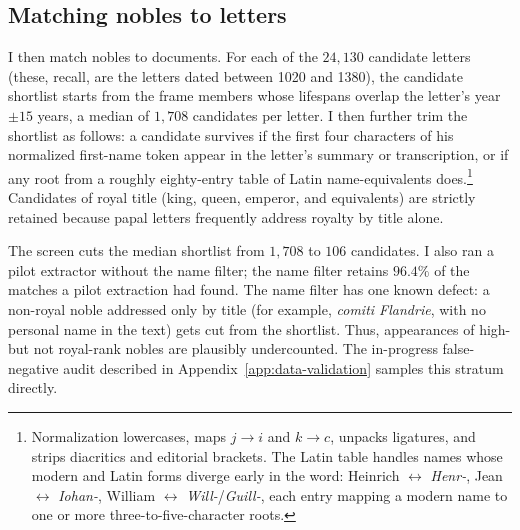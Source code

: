 \documentclass[12pt]{article}
\theoremstyle{definition}
\theoremstyle{remark}
\begin{document}
\subsection{Matching nobles to letters}
\label{app:data-matching}

I then match nobles to documents. For each of the $24{,}130$ candidate letters (these, recall, are the letters dated between 1020 and 1380), the candidate shortlist starts from the frame members whose lifespans overlap the letter's year $\pm 15$ years, a median of $1{,}708$ candidates per letter. I then further trim the shortlist as follows: a candidate survives if the first four characters of his normalized first-name token appear in the letter's summary or transcription, or if any root from a roughly eighty-entry table of Latin name-equivalents does.\footnote{Normalization lowercases, maps $j\to i$ and $k \to c$, unpacks ligatures, and strips diacritics and editorial brackets. The Latin table handles names whose modern and Latin forms diverge early in the word: Heinrich $\leftrightarrow$ \emph{Henr-}, Jean $\leftrightarrow$ \emph{Iohan-}, William $\leftrightarrow$ \emph{Will-}/\emph{Guill-}, each entry mapping a modern name to one or more three-to-five-character roots.} Candidates of royal title (king, queen, emperor, and equivalents) are strictly retained because papal letters frequently address royalty by title alone.

The screen cuts the median shortlist from $1{,}708$ to $106$ candidates. I also ran a pilot extractor without the name filter; the name filter retains $96.4\%$ of the matches a pilot extraction had found. The name filter has one known defect: a non-royal noble addressed only by title (for example, \emph{comiti Flandrie}, with no personal name in the text) gets cut from the shortlist. Thus, appearances of high- but not royal-rank nobles are plausibly undercounted. The in-progress false-negative audit described in Appendix~\ref{app:data-validation} samples this stratum directly.
\end{document}
